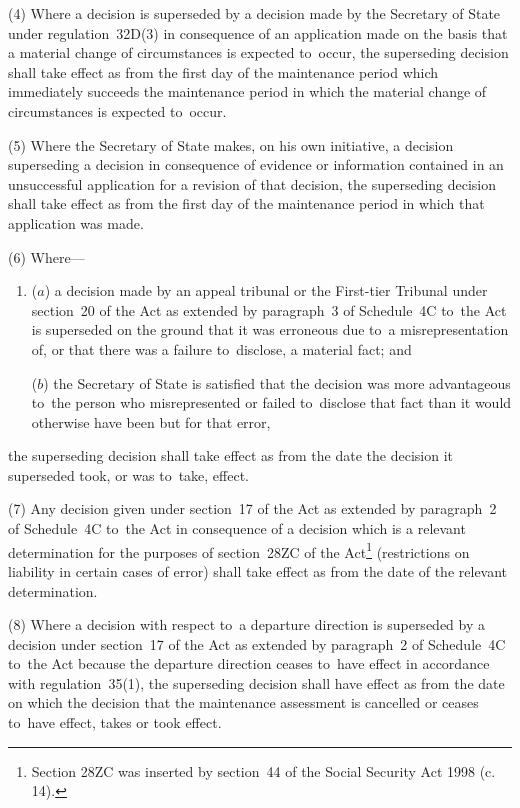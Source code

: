 \documentclass[12pt,a4paper]{article}
\begin{document}
(4) Where a decision is superseded by a decision made by the Secretary of State under regulation~32D(3) in consequence of an application made on the basis that a material change of circumstances is expected to~occur, the superseding decision shall take effect as from the first day of the maintenance period which immediately succeeds the maintenance period in which the material change of circumstances is expected to~occur.

(5) Where the Secretary of State makes, on his own initiative, a decision superseding a decision in consequence of evidence or information contained in an unsuccessful application for a revision of that decision, the superseding decision shall take effect as from the first day of the maintenance period in which that application was made.

(6) Where---
\begin{enumerate}\item[]
($a$) a decision made by 
an appeal tribunal or  %
the First-tier Tribunal  %
under section~20 of the Act as extended by paragraph~3 of Schedule~4C to~the Act is superseded on the ground that it was erroneous due to~a misrepresentation of, or that there was a failure to~disclose, a material fact; and

($b$) the Secretary of State is satisfied that the decision was more advantageous to~the person who misrepresented or failed to~disclose that fact than it would otherwise have been but for that error,
\end{enumerate}
the superseding decision shall take effect as from the date the decision it superseded took, or was to~take, effect.

(7) Any decision given under section~17 of the Act as extended by paragraph~2 of Schedule~4C to~the Act in consequence of a decision which is a relevant determination for the purposes of section~28ZC of the Act\footnote{\frenchspacing Section 28ZC was inserted by section~44 of the Social Security Act 1998 (c. 14).} (restrictions on liability in certain cases of error) shall take effect as from the date of the relevant determination.

(8) Where a decision with respect to~a departure direction is superseded by a decision under section~17 of the Act as extended by paragraph~2 of Schedule~4C to~the Act because the departure direction ceases to~have effect in accordance with regulation~35(1), the superseding decision shall have effect as from the date on which the decision that the maintenance assessment is cancelled or ceases to~have effect, takes or took effect.
\end{document}
